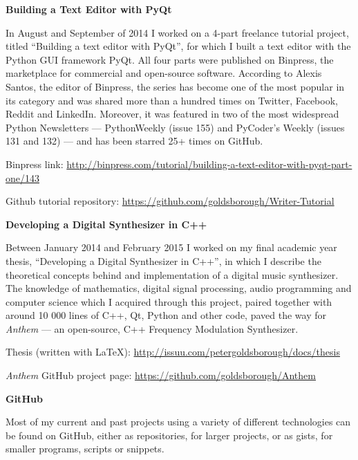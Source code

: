 \begin{body}
\textbf{Building a Text Editor with PyQt}

\begin{detail}
In August and September of 2014 I worked on a 4-part freelance tutorial project, titled ``Building a text editor with PyQt'', for which I built a text editor with the Python GUI framework PyQt. All four parts were published on Binpress, the marketplace for commercial and open-source software. According to Alexis Santos, the editor of Binpress, the series has become one of the most popular in its category and was shared more than a hundred times on Twitter, Facebook, Reddit and LinkedIn. Moreover, it was featured in two of the most widespread Python Newsletters --- PythonWeekly (issue 155) and PyCoder's Weekly (issues 131 and 132) --- and has been starred 25+ times on GitHub.

Binpress link: \href{http://binpress.com/tutorial/building-a-text-editor-with-pyqt-part-one/143}{http://binpress.com/tutorial/building-a-text-editor-with-pyqt-part-one/143}
\par
Github tutorial repository: \href{https://github.com/goldsborough/Writer-Tutorial}{https://github.com/goldsborough/Writer-Tutorial}
\end{detail}

\textbf{Developing a Digital Synthesizer in C++}

\begin{detail}
Between January 2014 and February 2015 I worked on my final academic year thesis, ``Developing a Digital Synthesizer in C++'', in which I describe the theoretical concepts behind and implementation of a digital music synthesizer. The knowledge of mathematics, digital signal processing, audio programming and computer science which I acquired through this project, paired together with around 10 000 lines of C++, Qt, Python and other code, paved the way for \emph{Anthem} --- an open-source, C++ Frequency Modulation Synthesizer.

Thesis (written with \LaTeX): \href{http://issuu.com/petergoldsborough/docs/thesis}{http://issuu.com/petergoldsborough/docs/thesis}
\par

\emph{Anthem} GitHub project page: \href{https://github.com/goldsborough/Anthem}{https://github.com/goldsborough/Anthem}
\end{detail}



\textbf{GitHub}

\begin{detail}
Most of my current and past projects using a variety of different technologies can be found on GitHub, either as repositories, for larger projects, or as gists, for smaller programs, scripts or snippets.


\end{detail}
\end{body}
